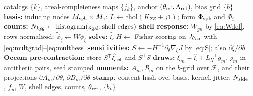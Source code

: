 \documentclass[11pt]{article}
\theoremstyle{definition}
\theoremstyle{remark}
\newcommand{\Msph}{M_{\rm sph}}
\newcommand{\Mz}{M_{z}}
\begin{document}
\begin{algorithm}[t]
\caption{Offline anchor construction (once per catalog set)}
\label{alg:offline}
\begin{algorithmic}[1]
\REQUIRE catalogs $\{k\}$, areal-completeness maps $\{f_k\}$, anchor
         $(\theta_{\rm ref},\Lambda_{\rm ref})$, bias grid $\{b\}$
\STATE \textbf{basis:} inducing nodes $\Msph\times\Mz$; $L\leftarrow\mathrm{chol}(K_{ZZ}+j\mathbb 1)$;
       form $\Phi_{\rm sph}$ and $\Phi_\zeta$ 
\STATE \textbf{counts:} $N_{kpg}\leftarrow\mathrm{histogram}(z_{\rm gal};\text{shell edges})$
\STATE \textbf{shell response:} $W_{gn}$ by \eqref{eq:Wdef}, rows normalised;
       $\tilde\phi_\zeta\leftarrow W\phi_\zeta$
\STATE \textbf{solve:} $\hat\xi,H\leftarrow$ Fisher scoring on $J_{\theta_{\rm ref}}$ with
       \eqref{eq:multgrad}--\eqref{eq:multhess} 
\STATE \textbf{sensitivities:} $S\leftarrow-H^{-1}\partial_\theta\nabla_\xi J$ by
       \eqref{eq:S}; also $\partial\hat\xi/\partial b$
\STATE \textbf{Occam pre-contraction:} store $S^{\!\top}\hat\xi_{\rm ref}$ and $S^{\!\top}S$
\STATE \textbf{draws:} $\xi_m=\hat\xi+L_H^{-\!\top}g_m$, $g_m$ in antithetic pairs, seed stamped
\STATE \textbf{moments:} $A_m,B_m$ on the $b$-grid over $\mathcal F$, and their
       projections $\partial A_m/\partial\theta$, $\partial B_m/\partial\theta$
\STATE \textbf{stamp:} content hash over basis, kernel, jitter, $N_{\rm side}$, $f_p$,
       $W$, shell edges, counts, $\theta_{\rm ref}$, $\{b_k\}$
\end{algorithmic}
\end{algorithm}
\end{document}
